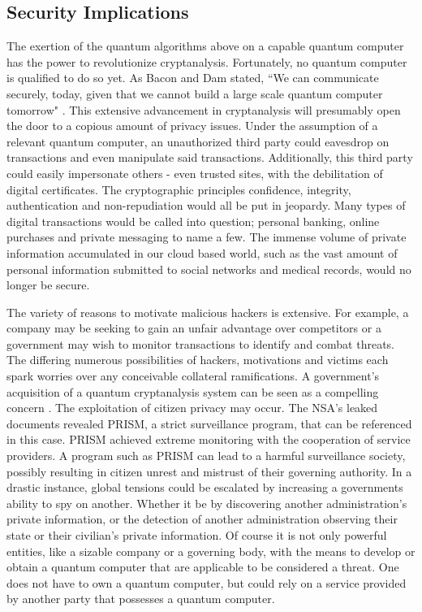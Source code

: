 \subsection{Security Implications}
The exertion of the quantum algorithms above on a capable quantum computer has the power to revolutionize cryptanalysis. Fortunately, no quantum computer is qualified to do so yet. As Bacon and Dam stated, ``We can communicate securely, today, given that we cannot build a large scale quantum computer tomorrow" \cite{Q_Alg}. This extensive advancement in cryptanalysis will presumably open the door to a copious amount of privacy issues. Under the assumption of a relevant quantum computer, an unauthorized third party could eavesdrop on transactions and even manipulate said transactions. Additionally, this third party could easily impersonate others - even trusted sites, with the debilitation of digital certificates. The cryptographic principles confidence, integrity, authentication and non-repudiation would all be put in jeopardy. Many types of digital transactions would be called into question; personal banking, online purchases and private messaging to name a few. The immense volume of private information accumulated in our cloud based world, such as the vast amount of personal information submitted to social networks and medical records, would no longer be secure. 

The variety of reasons to motivate malicious hackers is extensive. For example, a company may be seeking to gain an unfair advantage over competitors or a government may wish to monitor transactions to identify and combat threats. The differing numerous possibilities of hackers, motivations and victims each spark worries over any conceivable collateral ramifications. A government's acquisition of a quantum cryptanalysis system can be seen as a compelling concern \cite{Sec_Risk}. The exploitation of citizen privacy may occur. The NSA's leaked documents revealed PRISM, a strict surveillance program, that can be referenced in this case. PRISM achieved extreme monitoring with the cooperation of service providers. A program such as PRISM can lead to a harmful surveillance society, possibly resulting in citizen unrest and mistrust of their governing authority. In a drastic instance, global tensions could be escalated by increasing a governments ability to spy on another. Whether it be by discovering another administration's private information, or the detection of another administration observing their state or their civilian's private information. 
Of course it is not only powerful entities, like a sizable company or a governing body, with the means to develop or obtain a quantum computer that are applicable to be considered a threat. One does not have to own a quantum computer, but could rely on a service provided by another party that possesses a quantum computer. 